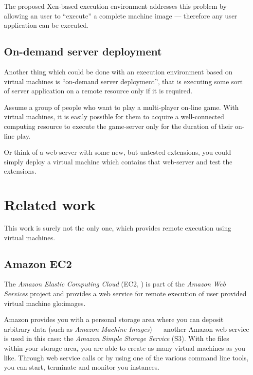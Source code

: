 The  proposed Xen-based  execution environment  addresses this  problem by
allowing an user to ``execute'' a complete machine image --- therefore any
user application can be executed.

\subsection{On-demand server deployment}
\label{sec:demand-serv-depl}

Another thing which  could be done with an  execution environment based on
virtual  machines is  ``on-demand server  deployment'', that  is executing
some  sort of  server  application on  a  remote resource  only  if it  is
required.

Assume  a  group  of  people  who  want to  play  a  multi-player  on-line
game. With virtual  machines, it is easily possible for  them to acquire a
well-connected computing resource to  execute the game-server only for the
duration of their on-line play.

Or think of a web-server with some new, but untested extensions, you could
simply deploy  a virtual machine  which contains that web-server  and test
the extensions.

\section{Related work}
\label{ref:related-work}

This  work is surely  not the  only one,  which provides  remote execution
using virtual machines.

\subsection{Amazon EC2}

The \emph{Amazon Elastic Computing Cloud} (EC2, \cite{amazon-ec2}) is part
of the \emph{Amazon  Web Services} project and provides  a web service for
remote execution of user provided virtual machine \gls{glo:image}s.

Amazon provides  you with  a personal storage  area where you  can deposit
arbitrary data  (such as \emph{Amazon Machine Images})  --- another Amazon
web service is used in this case: the \emph{Amazon Simple Storage Service}
(S3).  With the files within your  storage area, you are able to create as
many virtual machines  as you like. Through web service  calls or by using
one  of the  various  command line  tools,  you can  start, terminate  and
monitor you instances.

